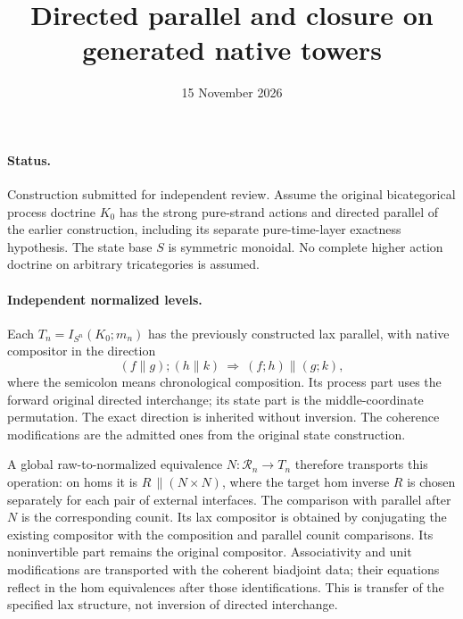 \documentclass{article}
\title{Directed parallel and closure on generated native towers}
\date{15 November 2026}
\begin{document}
\maketitle
\paragraph{Status.} Construction submitted for independent review. Assume the original bicategorical process doctrine $K_0$ has the strong pure-strand actions and directed parallel of the earlier construction, including its separate pure-time-layer exactness hypothesis. The state base $S$ is symmetric monoidal. No complete higher action doctrine on arbitrary tricategories is assumed.

\paragraph{Independent normalized levels.} Each $T_n=I_{S^n}(K_0;m_n)$ has the previously constructed lax parallel, with native compositor in the direction
\[
 (f\parallel g);(h\parallel k)\ \Longrightarrow\ (f;h)\parallel(g;k),
\]
where the semicolon means chronological composition. Its process part uses the forward original directed interchange; its state part is the middle-coordinate permutation. The exact direction is inherited without inversion. The coherence modifications are the admitted ones from the original state construction.

A global raw-to-normalized equivalence $N:\mathcal R_n\to T_n$ therefore transports this operation: on homs it is $R\,\parallel(N\times N)$, where the target hom inverse $R$ is chosen separately for each pair of external interfaces. The comparison with parallel after $N$ is the corresponding counit. Its lax compositor is obtained by conjugating the existing compositor with the composition and parallel counit comparisons. Its noninvertible part remains the original compositor. Associativity and unit modifications are transported with the coherent biadjoint data; their equations reflect in the hom equivalences after those identifications. This is transfer of the specified lax structure, not inversion of directed interchange.
\end{document}
